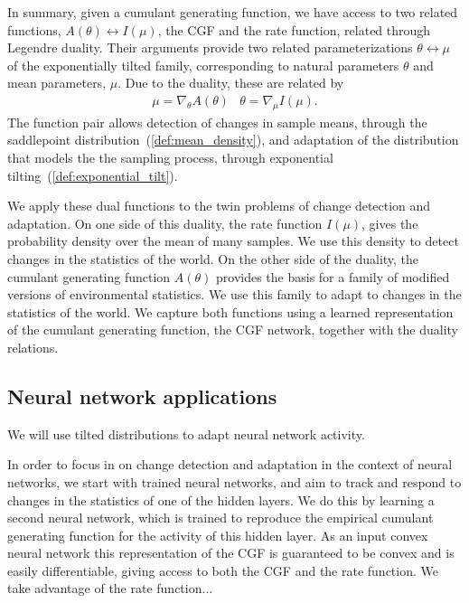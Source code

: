 \documentclass{article}      %
\begin{document}
In summary, given a cumulant generating function, we have access to two related functions, $A(\theta) \leftrightarrow I(\mu)$, the CGF and the rate function, related through Legendre duality.
Their arguments provide two related parameterizations $\theta \leftrightarrow \mu$ of the exponentially tilted family, corresponding to natural parameters $\theta$ and mean parameters, $\mu$.
Due to the duality, these are related by 
\begin{eqnarray}
  \mu = \nabla_\theta A(\theta) & \theta = \nabla_\mu I(\mu). \label{eq:duality_relations}
\end{eqnarray}
The function pair allows detection of changes in sample means, through the saddlepoint distribution~(\ref{def:mean_density}), and adaptation of the distribution that models the the sampling process, through exponential tilting~(\ref{def:exponential_tilt}).

We apply these dual functions to the twin problems of change detection and adaptation.
On one side of this duality, the rate function $I(\mu)$, gives the probability density over the mean of many samples.
We use this density to detect changes in the statistics of the world.
On the other side of the duality, the cumulant generating function $A(\theta)$ provides the basis for a family of modified versions of environmental statistics.
We use this family to adapt to changes in the statistics of the world.
We capture both functions using a learned representation of the cumulant generating function, the CGF network, together with the duality relations.

\subsection{Neural network applications}





We will use tilted distributions to adapt neural network activity.



In order to focus in on change detection and adaptation in the context of neural networks, we start with trained neural networks, and aim to track and respond to changes in the statistics of one of the hidden layers. 
We do this by learning a second neural network, which is trained to reproduce the empirical cumulant generating function for the activity of this hidden layer.
As an input convex neural network \cite{amos_input_2017} this representation of the CGF is guaranteed to be convex and is easily differentiable, giving access to both the CGF and the rate function.
We take advantage of the rate function...
\end{document}
